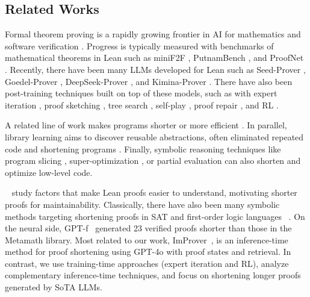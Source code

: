 \subsection{Related Works}

 Formal theorem proving is a rapidly growing frontier in AI for mathematics and software verification \citep{yang2024formal, li2024survey}. Progress is typically measured with benchmarks of mathematical theorems in Lean such as miniF2F \citep{zheng2021minif2f}, PutnamBench \citep{tsoukalas2024putnambench}, and ProofNet \citep{azerbayev2023proofnet}. Recently, there have been many LLMs developed for Lean such as Seed-Prover \citep{chen2507seed}, Goedel-Prover \citep{lin2025goedel}, DeepSeek-Prover \citep{ren2025deepseek}, and Kimina-Prover \citep{wang2025kimina}.  There have also been post-training techniques built on top of these models, such as with expert iteration \citep{lin2024lean}, proof sketching \citep{cao2025reviving}, tree search \citep{lample2022hypertree, zimmer2025bourbaki}, self-play \citep{dong2025stp}, proof repair \citep{ospanov2025apollo}, and RL \citep{gloeckle2024abel}.

 A related line of work makes programs shorter or more efficient \citep{schkufza2013stochastic, alphadev, pie, gautam2024refactorbench}. In parallel, library learning aims to discover reusable abstractions, often eliminated repeated code and shortening programs \citep{ellis2023dreamcoder, grand2023lilo, kaliszyk2015learning, wang2023lego, zhou2024refactor, berlot2024library}. Finally, symbolic reasoning techniques like program slicing \citep{weiser2009program}, super-optimization \citep{sasnauskas2017souper}, or partial evaluation \citep{jones1996introduction} can also shorten and optimize low-level code. 

 ~\citet{frieder2024data} study factors that make Lean proofs easier to understand, motivating shorter proofs for maintainability. Classically, there have also been many symbolic methods targeting shortening proofs in SAT and first-order logic languages ~\citep{rahul2001proof, vyskovcil2010automated, wernhard2024investigations, gladshtein2024small,kinyon-proof-simp}. On the neural side, GPT-f~\citep{polu2020generative} generated 23 verified proofs shorter than those in the Metamath library. Most related to our work, ImProver~\citep{ahuja2024improver}, is an inference-time method for proof shortening using GPT-4o with proof states and retrieval. In contrast, we use training-time approaches (expert iteration and RL), analyze complementary inference-time techniques, and focus on shortening longer proofs generated by SoTA LLMs.